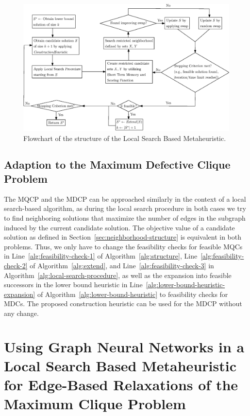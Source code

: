 \documentclass[draft,final]{vutinfth} %
\begin{document}
\begin{figure}
    \centering
    \includegraphics[width=\textwidth]{graphics/flowchart_local_search_algorithm.eps}
    \caption{Flowchart of the structure of the Local Search Based Metaheuristic.}
    \label{fig:flowchart-local-search-algorithm}
\end{figure}
 
\section{Adaption to the Maximum Defective Clique Problem}\label{sec:adaption-to-mdcp}
The MQCP and the MDCP can be approached similarly in the context of a local search-based algorithm, as during the local search procedure in both cases we try to find neighboring solutions that maximize the number of edges in the subgraph induced by the current candidate solution. The objective value of a candidate solution as defined in Section~\ref{sec:neighborhood-structure} is equivalent in both problems. Thus, we only have to change the feasibility checks for feasible MQCs in Line~\ref{alg:feasibility-check-1} of Algorithm~\ref{alg:structure}, Line~\ref{alg:feasibility-check-2} of Algorithm~\ref{alg:extend}, and Line~\ref{alg:feasibility-check-3} in Algorithm~\ref{alg:local-search-procedure}, as well as the expansion into feasible successors in the lower bound heuristic in Line~\ref{alg:lower-bound-heuristic-expansion} of Algorithm~\ref{alg:lower-bound-heuristic} to feasibility checks for MDCs. The proposed construction heuristic can be used for the MDCP without any change.  

\chapter{Using Graph Neural Networks in a Local Search Based Metaheuristic for Edge-Based Relaxations of the Maximum Clique Problem}\label{chp:gnn}
\end{document}
